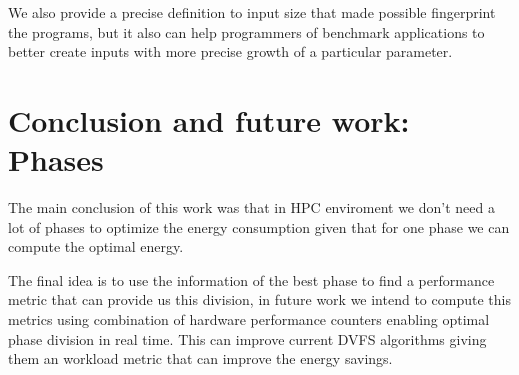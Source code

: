 We also provide a precise definition to input size that made possible fingerprint the programs, but it also can help programmers of benchmark applications to better create inputs with more precise growth of a particular parameter.

%

\section{Conclusion and future work: Phases}
The main conclusion of this work was that in HPC enviroment we don't need a lot of phases to optimize the energy consumption given that for one phase we can compute the optimal energy.

The final idea is to use the information of the best phase to find a performance metric that can provide us this division, in future work we intend to compute this metrics using combination of hardware performance counters enabling optimal phase division in real time. This can improve current DVFS algorithms giving them an workload metric that can improve the energy savings.
